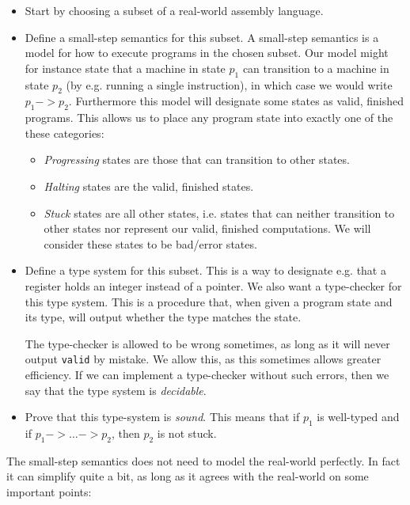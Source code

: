 \begin{itemize}
\item Start by choosing a subset of a real-world assembly language.

\item Define a small-step semantics for this subset. A small-step semantics is a
  model for how to execute programs in the chosen subset. Our model might for
  instance state that a machine in state $p_1$ can transition to a machine in
  state $p_2$ (by e.g. running a single instruction), in which case we would
  write $p_1 -> p_2$. Furthermore this model will designate some states as
  valid, finished programs. This allows us to place any program state into
  exactly one of the these categories:

  \begin{itemize}
  \item \emph{Progressing} states are those that can transition to other states.
  \item \emph{Halting} states are the valid, finished states.
  \item \emph{Stuck} states are all other states, i.e. states that can neither
    transition to other states nor represent our valid, finished
    computations. We will consider these states to be bad/error states.
  \end{itemize}

\item Define a type system for this subset. This is a way to designate e.g. that
  a register holds an integer instead of a pointer. We also want a type-checker
  for this type system. This is a procedure that, when given a program state and
  its type, will output whether the type matches the state.

  The type-checker is allowed to be wrong sometimes, as long as it will never
  output \texttt{valid} by mistake. We allow this, as this sometimes allows
  greater efficiency. If we can implement a type-checker without such errors,
  then we say that the type system is \emph{decidable}.

\item Prove that this type-system is \emph{sound}. This means that if $p_1$ is
  well-typed and if $p_1 -> \dots -> p_2$, then $p_2$ is not stuck.
\end{itemize}

The small-step semantics does not need to model the real-world perfectly. In
fact it can simplify quite a bit, as long as it agrees with the real-world
on some important points:

